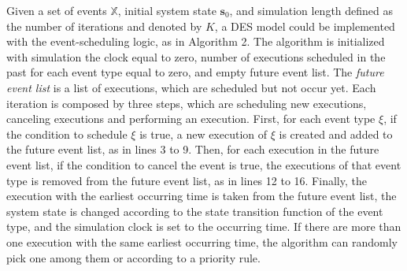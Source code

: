 \documentclass[suppldata]{interact}
\theoremstyle{plain}
\theoremstyle{definition}
\theoremstyle{remark}
\begin{document}
Given a set of events $\mathbb{X}$, initial system state $\textbf{s}_0$, and simulation length defined as the number of iterations and denoted by $K$, a DES model could be implemented with the event-scheduling logic, as in Algorithm 2. The algorithm is initialized with simulation the clock equal to zero, number of executions scheduled in the past for each event type equal to zero, and empty future event list. The \textit{future event list} is a list of executions, which are scheduled but not occur yet. Each iteration is composed by three steps, which are scheduling new executions, canceling executions and performing an execution. First, for each event type $\xi$, if the condition to schedule $\xi$ is true, a new execution of $\xi$ is created and added to the future event list, as in lines 3 to 9. Then, for each execution in the future event list, if the condition to cancel the event is true, the executions of that event type is removed from the future event list, as in lines 12 to 16. Finally, the execution with the earliest occurring time is taken from the future event list, the system state is changed according to the state transition function of the event type, and the simulation clock is set to the occurring time. If there are more than one execution with the same earliest occurring time, the algorithm can randomly pick one among them or according to a priority rule.
\end{document}
